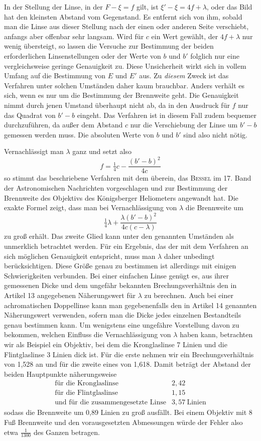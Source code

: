 In der Stellung der Linse, in der $F-\xi=f$ gilt, ist $\xi'-\xi=4f+\lambda$, oder das Bild hat den kleinsten Abstand vom Gegenstand. Es entfernt sich von ihm, sobald man die Linse aus dieser Stellung nach der einen oder anderen Seite verschiebt, anfangs aber offenbar sehr langsam. Wird für $c$ ein Wert gewählt, der $4f+\lambda$ nur wenig übersteigt, so lassen die Versuche zur Bestimmung der beiden erforderlichen Linsenstellungen oder der Werte von $b$ und $b'$ folglich nur eine vergleichsweise geringe Genauigkeit zu. Diese Unsicherheit wirkt sich in vollem Umfang auf die Bestimmung von $E$ und $E'$ aus. Zu \textit{diesem} Zweck ist das Verfahren unter solchen Umständen daher kaum brauchbar. Anders verhält es sich, wenn es nur um die Bestimmung der Brennweite geht. Die Genauigkeit nimmt durch jenen Umstand überhaupt nicht ab, da in den Ausdruck für $f$ nur das Quadrat von $b'-b$ eingeht. Das Verfahren ist in diesem Fall zudem bequemer durchzuführen, da außer dem Abstand $c$ nur die Verschiebung der Linse um $b'-b$ gemessen werden muss. Die absoluten Werte von $b$ und $b'$ sind also nicht nötig.

Vernachlässigt man $\lambda$ ganz und setzt also
\[
f=\tfrac14c-\frac{(b'-b)^2}{4c}
\]
so stimmt das beschriebene Verfahren mit dem überein, das \textsc{Bessel} im 17. Band der Astronomischen Nachrichten vorgeschlagen und zur Bestimmung der Brennweite des Objektivs des Königsberger Heliometers angewandt hat. Die exakte Formel zeigt, dass man bei Vernachlässigung von $\lambda$ die Brennweite um
\[
\tfrac14\lambda+\frac{\lambda(b'-b)^2}{4c(c-\lambda)}
\]
zu groß erhält. Das zweite Glied kann unter den genannten Umständen als unmerklich betrachtet werden. Für ein Ergebnis, das der mit dem Verfahren an sich möglichen Genauigkeit entspricht, muss man $\lambda$ daher unbedingt berücksichtigen. Diese Größe genau zu bestimmen ist allerdings mit einigen Schwierigkeiten verbunden. Bei einer einfachen Linse genügt es, aus ihrer gemessenen Dicke und dem ungefähr bekannten Brechungsverhältnis den in Artikel 13 angegebenen Näherungswert für $\lambda$ zu berechnen. Auch bei einer achromatischen Doppellinse kann man gegebenenfalls den in Artikel 14 genannten Näherungswert verwenden, sofern man die Dicke jedes einzelnen Bestandteils genau bestimmen kann. Um wenigstens eine ungefähre Vorstellung davon zu bekommen, welchen Einfluss die Vernachlässigung von $\lambda$ haben kann, betrachten wir als Beispiel ein Objektiv, bei dem die Kronglaslinse 7 Linien und die Flintglaslinse 3 Linien dick ist. Für die erste nehmen wir ein Brechungsverhältnis von 1,528 an und für die zweite eines von 1,618. Damit beträgt der Abstand der beiden Hauptpunkte näherungsweise
\[
\begin{array}{lr}
\text{für die Kronglaslinse}&2{,}42\\
\text{für die Flintglaslinse}&1{,}15\\
\text{und für die zusammengesetzte Linse}&3{,}57\ \text{Linien}
\end{array}
\]
sodass die Brennweite um 0,89 Linien zu groß ausfällt. Bei einem Objektiv mit 8 Fuß Brennweite und den vorausgesetzten Abmessungen würde der Fehler also etwa $\frac1{1300}$ des Ganzen betragen.

